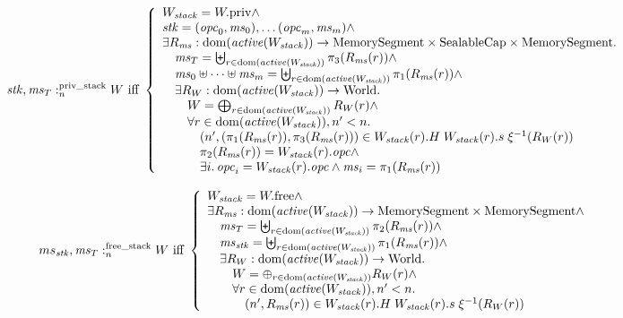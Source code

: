 \documentclass[a4paper]{article}
\begin{document}
\[
  \memSatStack{\stk,\ms_T}{W} \text{ iff } 
  \left\{
    \begin{array}{l}
      W_\var{stack} = \pwpriv \wedge \\
      \stk = (\opc_0,\ms_0), \dots (\opc_m,\ms_m) \wedge \\
      \exists R_\ms : \dom(\activeReg{W_\var{stack}}) \fun \MemSeg \times \SealableCaps \times \MemSeg \ldotp \\
      \quad \ms_T = \biguplus_{r \in \dom(\activeReg{W_\var{stack}})} \pi_3(R_\ms(r)) \wedge \\
      \quad \ms_0 \uplus \dots \uplus \ms_m = \biguplus_{r \in \dom(\activeReg{W_\var{stack}})} \pi_1(R_\ms(r)) \wedge \\
      \quad \exists R_W : \dom(\activeReg{W_\var{stack}}) \fun \World \ldotp \\
      \qquad W = \bigoplus_{r \in \dom(\activeReg{W_\var{stack}})} R_W(r) \wedge \\
      \qquad \forall r \in \dom(\activeReg{W_\var{stack}}), n' < n \ldotp \\
      \qquad \quad \npair[n']{(\pi_1(R_\ms(r)),\pi_3(R_\ms(r))} \in W_\var{stack}(r).H \; W_\var{stack}(r).s \; \xi^{-1}(R_W(r)) \\
      \qquad \quad \pi_2(R_\ms(r)) = W_\var{stack}(r).\opc \wedge\\
      \qquad \quad \exists i \ldotp \opc_i = W_\var{stack}(r).\opc \wedge \ms_i = \pi_1 (R_\ms(r))
    \end{array}
  \right.
\]

\[
  \memSatFStack{ms_\stk,\ms_T}{W} \text{ iff } 
  \left\{
    \begin{array}{l}
      W_\var{stack} = \pwfree \wedge \\
      \exists R_\ms : \dom(\activeReg{W_\var{stack}}) \fun \MemSeg \times \MemSeg \wedge \\
      \quad \ms_T = \biguplus_{r \in \dom(\activeReg{W_\var{stack}})} \pi_2(R_\ms(r)) \wedge \\
      \quad \ms_\stk = \biguplus_{r \in \dom(\activeReg{W_\var{stack}})} \pi_1(R_\ms(r)) \wedge \\
      \quad \exists R_W : \dom(\activeReg{W_\var{stack}}) \fun \World\ldotp\\
      \qquad W = \oplus_{r \in \dom(\activeReg{W_\var{stack}})} R_W(r) \wedge\\
      \qquad \forall r \in \dom(\activeReg{W_\var{stack}}), n' < n \ldotp \\
      \qquad \quad \npair[n']{R_\ms(r)} \in  W_\var{stack}(r).H \; W_\var{stack}(r).s \; \xi^{-1}(R_W(r))
    \end{array}
  \right.
\]
\end{document}
